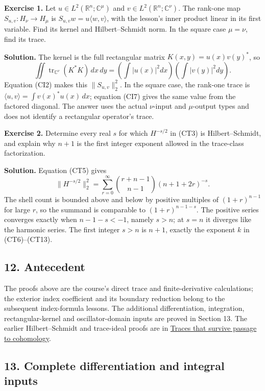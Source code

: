 \documentclass[
  11pt,
]{article}
\begin{document}
\textbf{Exercise 1.} Let \(u\in L^2(\mathbb R^n;\mathbb C^\mu)\) and
\(v\in L^2(\mathbb R^n;\mathbb C^\nu)\). The rank-one map
\(S_{u,v}:H_\nu\to H_\mu\) is \(S_{u,v}w=u\langle w,v\rangle\), with the
lesson's inner product linear in its first variable. Find its kernel and
Hilbert--Schmidt norm. In the square case \(\mu=\nu\), find its trace.

\textbf{Solution.} The kernel is the full rectangular matrix
\(K(x,y)=u(x)v(y)^*\), so \[
 \iint\operatorname{tr}_{\mathbb C^\nu}(K^*K)\,dx\,dy
   =\left(\int|u(x)|^2dx\right)
      \left(\int|v(y)|^2dy\right).
 \tag{WT4}
\] Equation (CI2) makes this \(\|S_{u,v}\|_2^2\). In the square case,
the rank-one trace is \(\langle u,v\rangle=\int v(x)^*u(x)\,dx\);
equation (CI7) gives the same value from the factored diagonal. The
answer uses the actual \(\nu\)-input and \(\mu\)-output types and does
not identify a rectangular operator's trace.

\textbf{Exercise 2.} Determine every real \(s\) for which \(H^{-s/2}\)
in (CT3) is Hilbert--Schmidt, and explain why \(n+1\) is the first
integer exponent allowed in the trace-class factorization.

\textbf{Solution.} Equation (CT5) gives \[
 \|H^{-s/2}\|_2^2
  =\sum_{r=0}^\infty
       \binom{r+n-1}{n-1}(n+1+2r)^{-s}.
 \tag{WT5}
\] The shell count is bounded above and below by positive multiples of
\((1+r)^{n-1}\) for large \(r\), so the summand is comparable to
\((1+r)^{n-1-s}\). The positive series converges exactly when
\(n-1-s<-1\), namely \(s>n\); at \(s=n\) it diverges like the harmonic
series. The first integer \(s>n\) is \(n+1\), exactly the exponent \(k\)
in (CT6)--(CT13).

\subsection{12. Antecedent}\label{antecedent}

The proofs above are the course's direct trace and finite-derivative
calculations; the exterior index coefficient and its boundary reduction
belong to the subsequent index-formula lessons. The additional
differentiation, integration, rectangular-kernel and oscillator-domain
inputs are proved in Section 13. The earlier Hilbert--Schmidt and
trace-ideal proofs are in \href{traces-and-complexes.pdf}{Traces that
survive passage to cohomology}.

\subsection{13. Complete differentiation and integral
inputs}\label{complete-differentiation-and-integral-inputs}
\end{document}
